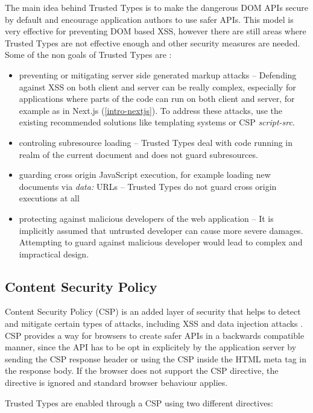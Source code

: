 The main idea behind Trusted Types is to make the dangerous DOM APIs secure by default and encourage
application authors to use safer APIs. This model is very effective for preventing DOM based XSS,
however there are still areas where Trusted Types are not effective enough and other security
measures are needed. Some of the non goals of Trusted Types are \cite{tt_spec:non_goals}:

\begin{itemize}
  \item preventing or mitigating server side generated markup attacks -- Defending against XSS on
        both client and server can be really complex, especially for applications where parts of the
        code can run on both client and server, for example as in Next.js (\ref{intro-nextjs}). To
        address these attacks, use the existing recommended solutions like templating systems or CSP
        \emph{script-src}.
  \item controling subresource loading -- Trusted Types deal with code running in realm of the
        current document and does not guard subresources.
  \item guarding cross origin JavaScript execution, for example loading new documents via
        \emph{data:} URLs -- Trusted Types do not guard cross origin executions at all
  \item protecting against malicious developers of the web application -- It is implicitly assumed
        that untrusted developer can cause more severe damages. Attempting to guard against
        malicious developer would lead to complex and impractical design.
\end{itemize}

\subsection{Content Security Policy}
\label{csp}

Content Security Policy (CSP) is an added layer of security that helps to detect and mitigate
certain types of attacks, including XSS and data injection attacks \cite{mdn_csp_def}. CSP provides
a way for browsers to create safer APIs in a backwards compatible manner, since the API has to be
opt in explicitely by the application server by sending the CSP response header or using the CSP
inside the HTML meta tag in the response body. If the browser does not support the CSP directive,
the directive is ignored and standard browser behaviour applies.

Trusted Types are enabled through a CSP using two different directives:

